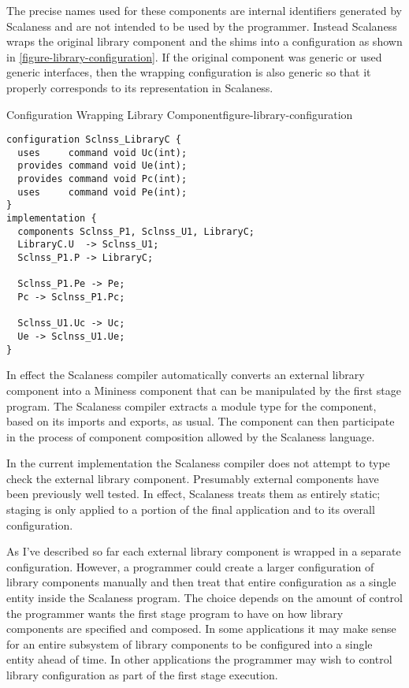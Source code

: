 The precise names used for these components are internal identifiers generated by Scalaness and
are not intended to be used by the programmer. Instead Scalaness wraps the original library
component and the shims into a configuration as shown in \autoref{figure-library-configuration}.
If the original component was generic or used generic interfaces, then the wrapping
configuration is also generic so that it properly corresponds to its representation in
Scalaness.

\singlespace
\begin{fpfig}[tbhp]{Configuration Wrapping Library Component}{figure-library-configuration}
{
\begin{lstlisting}[language=nesC]
configuration Sclnss_LibraryC {
  uses     command void Uc(int);
  provides command void Ue(int);
  provides command void Pc(int);
  uses     command void Pe(int);
}
implementation {
  components Sclnss_P1, Sclnss_U1, LibraryC;
  LibraryC.U  -> Sclnss_U1;
  Sclnss_P1.P -> LibraryC;

  Sclnss_P1.Pe -> Pe;
  Pc -> Sclnss_P1.Pc;
  
  Sclnss_U1.Uc -> Uc;
  Ue -> Sclnss_U1.Ue;
}
\end{lstlisting}
}
\end{fpfig}
\primaryspacing

In effect the Scalaness compiler automatically converts an external library component into a
Mininess component that can be manipulated by the first stage program. The Scalaness compiler
extracts a module type for the component, based on its imports and exports, as usual. The
component can then participate in the process of component composition allowed by the Scalaness
language.

In the current implementation the Scalaness compiler does not attempt to type check the external
library component. Presumably external components have been previously well tested. In effect,
Scalaness treats them as entirely static; staging is only applied to a portion of the final
application and to its overall configuration.


As I've described so far each external library component is wrapped in a separate configuration.
However, a programmer could create a larger configuration of library components manually and
then treat that entire configuration as a single entity inside the Scalaness program. The choice
depends on the amount of control the programmer wants the first stage program to have on how
library components are specified and composed. In some applications it may make sense for an
entire subsystem of library components to be configured into a single entity ahead of time. In
other applications the programmer may wish to control library configuration as part of the first
stage execution.


